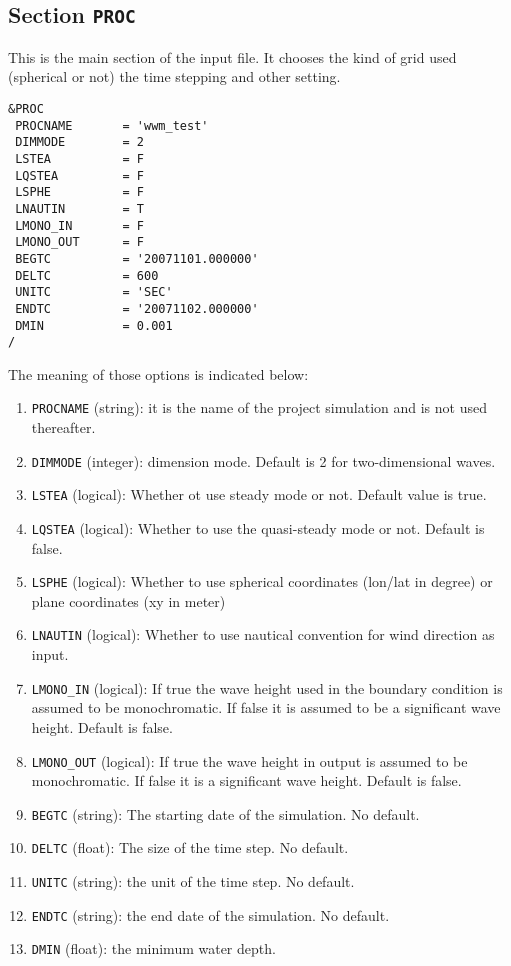 \documentclass[12pt]{amsart}
\begin{document}
\subsection{Section {\tt PROC}}
This is the main section of the input file. It chooses the kind of grid used (spherical or not) the time stepping and other setting.
\begin{verbatim}
&PROC
 PROCNAME       = 'wwm_test'
 DIMMODE        = 2                  
 LSTEA          = F                  
 LQSTEA         = F                  
 LSPHE          = F                  
 LNAUTIN        = T
 LMONO_IN       = F                
 LMONO_OUT      = F                
 BEGTC          = '20071101.000000'
 DELTC          = 600              
 UNITC          = 'SEC'            
 ENDTC          = '20071102.000000'
 DMIN           = 0.001            
/
\end{verbatim}
The meaning of those options is indicated below:
\begin{enumerate}
\item {\tt PROCNAME} (string): it is the name of the project simulation and is not used thereafter.
\item {\tt DIMMODE} (integer): dimension mode. Default is 2 for two-dimensional waves.
\item {\tt LSTEA} (logical): Whether ot use steady mode or not. Default value is true.
\item {\tt LQSTEA} (logical): Whether to use the quasi-steady mode or not. Default is false.
\item {\tt LSPHE} (logical): Whether to use spherical coordinates (lon/lat in degree) or plane coordinates (xy in meter)
\item {\tt LNAUTIN} (logical): Whether to use nautical convention for wind direction as input.
\item {\tt LMONO\_IN} (logical): If true the wave height used in the boundary condition is assumed to be monochromatic. If false it is assumed to be a significant wave height. Default is false.
\item {\tt LMONO\_OUT} (logical): If true the wave height in output is assumed to be monochromatic. If false it is a significant wave height. Default is false.
\item {\tt BEGTC} (string): The starting date of the simulation. No default.
\item {\tt DELTC} (float): The size of the time step. No default.
\item {\tt UNITC} (string): the unit of the time step. No default.
\item {\tt ENDTC} (string): the end date of the simulation. No default.
\item {\tt DMIN} (float): the minimum water depth.
\end{enumerate}
\end{document}
